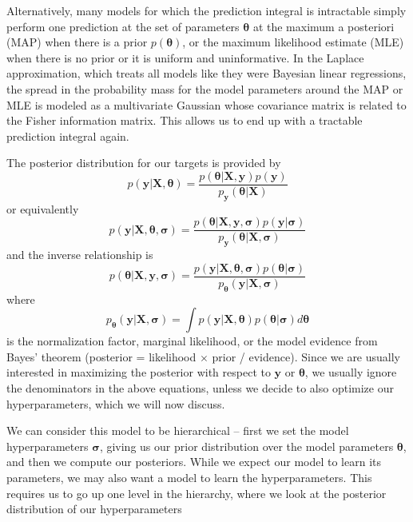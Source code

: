 \documentclass{article}
\begin{document}
Alternatively, many models for which the prediction integral is intractable simply perform one prediction at the set of parameters $\boldsymbol{\theta}$ at the maximum a posteriori (MAP) when there is a prior $p(\boldsymbol{\theta})$, or the maximum likelihood estimate (MLE) when there is no prior or it is uniform and uninformative. In the Laplace approximation, which treats all models like they were Bayesian linear regressions, the spread in the probability mass for the model parameters around the MAP or MLE is modeled as a multivariate Gaussian whose covariance matrix is related to the Fisher information matrix. This allows us to end up with a tractable prediction integral again.

The posterior distribution for our targets is provided by  \begin{equation} p(\mathbf{y}|\mathbf{X}, \boldsymbol{\theta})=\frac{p(\boldsymbol{\theta}|\mathbf{X},\mathbf{y})p(\mathbf{y})}{p_\mathbf{y}(\boldsymbol{\theta}|\mathbf{X})}\end{equation}or equivalently \begin{equation} p(\mathbf{y}|\mathbf{X}, \boldsymbol{\theta},\boldsymbol{\sigma})=\frac{p(\boldsymbol{\theta}|\mathbf{X},\mathbf{y},\boldsymbol{\sigma})p(\mathbf{y}|\boldsymbol{\sigma})}{p_\mathbf{y}(\boldsymbol{\theta}|\mathbf{X},\boldsymbol{\sigma})}\end{equation}and the inverse relationship is
\begin{equation}    p(\boldsymbol{\theta}|\mathbf{X},\mathbf{y},\boldsymbol{\sigma})=\frac{p(\mathbf{y}|\mathbf{X},\boldsymbol{\theta},\boldsymbol{\sigma})p(\boldsymbol{\theta}|\boldsymbol{\sigma})}{p_{\boldsymbol{\theta}}(\mathbf{y}|\mathbf{X},\boldsymbol{\sigma})}
\end{equation}where
\begin{equation}
\label{eq:define_marginal_likelihood}
  p_{\boldsymbol{\theta}}(\mathbf{y}|\mathbf{X},\boldsymbol{\sigma})=\int p(\mathbf{y}|\mathbf{X},\boldsymbol{\theta})p(\boldsymbol{\theta}|\boldsymbol{\sigma})d\boldsymbol{\theta}
\end{equation}is the normalization factor, marginal likelihood, or the model evidence from Bayes' theorem (posterior = likelihood $\times$ prior / evidence). Since we are usually interested in maximizing the posterior with respect to $\mathbf{y}$ or $\boldsymbol{\theta}$, we usually ignore the denominators in the above equations, unless we decide to also optimize our hyperparameters, which we will now discuss.

We can consider this model to be hierarchical -- first we set the model hyperparameters $\boldsymbol{\sigma}$, giving us our prior distribution  over the model parameters $\boldsymbol{\theta}$, and then we compute our posteriors. While we expect our model to learn its parameters, we may also want a model to learn the hyperparameters. This requires us to go up one level in the hierarchy, where we look at the posterior distribution of our hyperparameters
\end{document}
